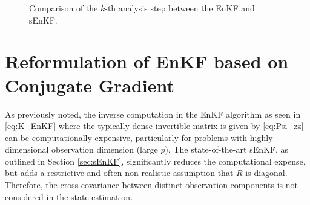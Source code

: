 \documentclass[11p]{elsarticle}
\numberwithin{equation}{section}
\newcommand{\vect}[1]{\ensuremath{\bm{#1}}}
\begin{document}
\begin{figure}[htbp]
  
  \vspace{0.5cm}
  \caption{Comparison of the $k$-th analysis step between the EnKF and sEnKF.}
  \label{fig:comparison}
\end{figure}


\section{Reformulation of EnKF based on Conjugate Gradient}
\label{sec:CGreformulation}

As previously noted, the inverse computation in the EnKF algorithm as seen in \eqref{eq:K_EnKF} where the typically dense invertible matrix is given by \eqref{eq:Psi_zz} can be computationally expensive, particularly for problems with highly dimensional observation dimension (large $p$).  The state-of-the-art sEnKF, as outlined in Section \ref{sec:sEnKF}, significantly reduces the computational expense, but adds a restrictive and often non-realistic assumption that $R$ is diagonal.  Therefore, the cross-covariance between distinct observation components is not considered in the state estimation.  
\end{document}
